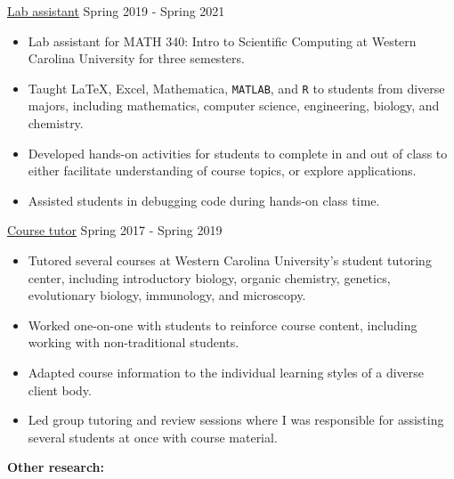 \documentclass[11pt]{article}
\begin{document}
\ul{Lab assistant} \hfill Spring 2019 - Spring 2021 
\begin{itemize}
\item Lab assistant for MATH 340: Intro to Scientific Computing at Western Carolina University for three semesters.
\item Taught \LaTeX{}, Excel, Mathematica, \texttt{MATLAB}, and \texttt{R} to students from diverse majors, including mathematics, computer science, engineering, biology, and chemistry.
\item Developed hands-on activities for students to complete in and out of class to either facilitate understanding of course topics, or explore applications.
\item Assisted students in debugging code during hands-on class time.
\end{itemize}

\ul{Course tutor} \hfill Spring 2017 - Spring 2019
\begin{itemize}
\item Tutored several courses at Western Carolina University's student tutoring center, including introductory biology, organic chemistry, genetics, evolutionary biology, immunology, and microscopy.
\item Worked one-on-one with students to reinforce course content, including working with non-traditional students.
\item Adapted course information to the individual learning styles of a diverse client body.
\item Led group tutoring and review sessions where I was responsible for assisting several students at once with course material.
\end{itemize}

\vspace{0.2in}
\textbf{Other research:}
\end{document}
